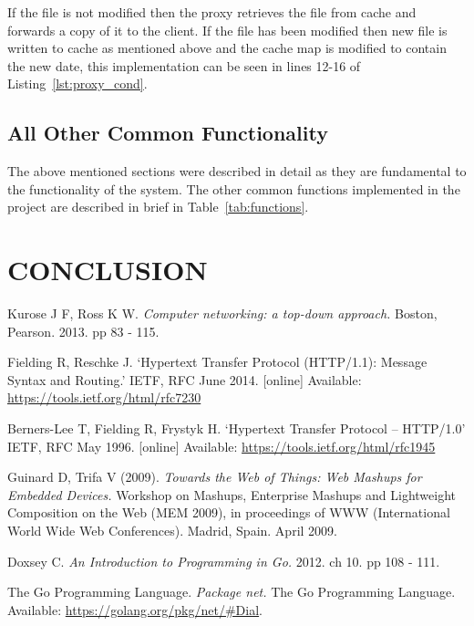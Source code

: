 \documentclass[10pt,twocolumn]{witseiepaper}
\begin{document}
		If the file is not modified then the proxy retrieves the file from cache and forwards a copy of it to the client. If the file has been modified then new file is written to cache as mentioned above and the cache map is modified to contain the new date, this implementation can be seen in lines 12-16 of Listing~\ref{lst:proxy_cond}. 
	
	\subsection{All Other Common Functionality}
	
		The above mentioned sections were described in detail as they are fundamental to the functionality of the system. The other common functions implemented in the project are described in brief in Table~\ref{tab:functions}.


\section{CONCLUSION}


\begin{thebibliography}{1}

 Kurose J F, Ross K W. \emph{Computer networking: a top-down approach.} Boston, Pearson. 2013. pp 83 - 115.

 Fielding R, Reschke J. `Hypertext Transfer Protocol (HTTP/1.1): Message Syntax and Routing.' IETF, RFC June 2014. [online] Available: \url{https://tools.ietf.org/html/rfc7230}

 Berners-Lee T, Fielding R, Frystyk H. `Hypertext Transfer Protocol -- HTTP/1.0' IETF, RFC May 1996. [online] Available: \url{https://tools.ietf.org/html/rfc1945}

   Guinard D, Trifa V (2009). \emph{Towards the Web of Things: Web Mashups for Embedded Devices.} Workshop on Mashups, Enterprise Mashups and Lightweight Composition on the Web (MEM 2009), in proceedings of WWW (International World Wide Web Conferences). Madrid, Spain. April 2009.  

 Doxsey C. \emph{An Introduction to Programming in Go.} 2012. ch 10. pp 108 - 111.

 The Go Programming Language. \emph{Package net.} The Go Programming Language. Available: \url{https://golang.org/pkg/net/#Dial}.


\end{thebibliography}
\end{document}
